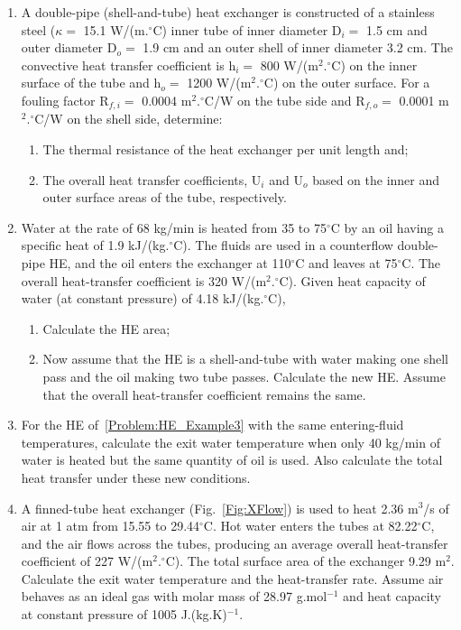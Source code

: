 \documentclass[12pts,a4paper,amsmath,amssymb,floatfix]{article}%
\begin{document}
\begin{enumerate}[label=\bfseries Problem \arabic*:]
\item\label{Problem:HE_Example2} A double-pipe (shell-and-tube) heat exchanger is constructed of a stainless steel ($\kappa=$ 15.1 W/(m.$^{\circ}$C) inner tube of inner diameter D$_{i}=$ 1.5 cm and outer diameter D$_{o}=$ 1.9 cm and an outer shell of inner diameter 3.2 cm. The convective heat transfer coefficient is h$_{i}=$ 800 W/(m$^{2}.^{\circ}$C) on the inner surface of the tube and h$_{o}=$ 1200 W/(m$^{2}.^{\circ}$C) on the outer surface. For a fouling factor R$_{f,i}=$ 0.0004 m$^{2}.^{\circ}$C/W on the tube side and R$_{f,o}=$ 0.0001 m$^{2}.^{\circ}$C/W on the shell side, determine:
\begin{enumerate}
   \item The thermal resistance of the heat exchanger per unit length and; 
   \item The overall heat transfer coefficients, U$_{i}$ and U$_{o}$ based on the inner and outer surface areas of the tube, respectively.
\end{enumerate}

\item\label{Problem:HE_Example3} Water at the rate of 68 kg/min is heated from 35 to 75$^{\circ}$C by an oil having a specific heat of 1.9 kJ/(kg.$^{\circ}$C). The fluids are used in a counterflow double-pipe HE, and the oil enters the exchanger at 110$^{\circ}$C and leaves at 75$^{\circ}$C. The overall heat-transfer coefficient is 320 W/(m$^{2}.^{\circ}$C). Given heat capacity of water (at constant pressure) of 4.18 kJ/(kg.$^{\circ}$C),
\begin{enumerate}
   \item Calculate the HE area;
   \item Now assume that the HE is a shell-and-tube with water making one shell pass and the oil making two tube passes. Calculate the new HE. Assume that the overall heat-transfer coefficient remains the same.
\end{enumerate}

\item\label{Problem:HE_Example4}For the HE of~\ref{Problem:HE_Example3} with the same entering-fluid temperatures, calculate the exit water temperature when only 40 kg/min of water is heated but the same quantity of oil is used. Also calculate the total heat transfer under these new conditions.

\item\label{Problem:HE_Example5}  A finned-tube heat exchanger (Fig.~\ref{Fig:XFlow}) is used to heat 2.36 m$^{3}$/s of air at 1 atm from 15.55 to 29.44$^{\circ}$C. Hot water enters the tubes at 82.22$^{\circ}$C, and the air flows across the tubes, producing an average overall heat-transfer coefficient of 227 W/(m$^{2}$.$^{\circ}$C). The total surface area of the exchanger 9.29 m$^{2}$. Calculate the exit water temperature and the heat-transfer rate. Assume air behaves as an ideal gas with molar mass of 28.97 g.mol$^{-1}$ and heat capacity at constant pressure of 1005 J.(kg.K)$^{-1}$.


\end{enumerate}
\end{document}
